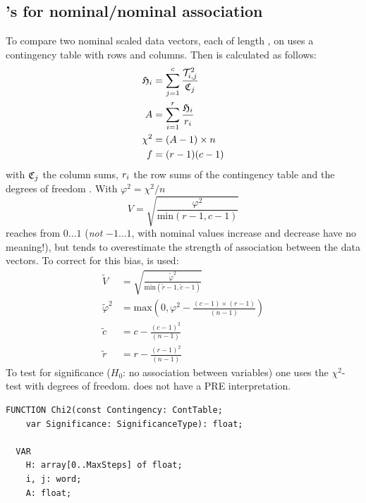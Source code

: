 \begin{refsection}
\subsection{'s  for nominal/nominal association}

To compare two nominal scaled data vectors, each of length , on uses a contingency table  with  rows and  columns. Then  is calculated as follows:
\begin{align}
  \mathfrak{H}_i &= \sum_{j=1}^c{\frac{\mathcal{T}_{i,j}^2}{\mathfrak{C}_j}} \\
  A      &= \sum_{i=1}^r{\frac{\mathfrak{H}_i}{r_i}} \\
  \chi^2 &= (A-1) \times n \\
  f      &= (r-1) (c-1) \\
\end{align}
with \(\mathfrak{C}_j \) the column sums, \(r_i \) the row sums of the contingency table and  the degrees of freedom \parencite{Pea-00}. With \(\varphi^2 = \chi^2 / n \)
\begin{equation}
  V = \sqrt{\frac{\varphi^2}{\mathrm{min}(r-1, c-1)}}
\end{equation}
 reaches from \(0\ldots 1 \) (\emph{not} \(-1\ldots 1 \), with nominal values increase and decrease have no meaning!),  but tends to overestimate the strength of association between the data vectors. To correct for this bias,  is used:
\begin{align}
  \tilde{V} &= \sqrt{\frac{\tilde{\varphi}^2}{\mathrm{min}(\tilde{r}-1, \tilde{c}-1)}} \\
  \tilde{\varphi}^2 &= \mathrm{max}(0, \varphi^2 - \frac{(c-1)\times (r-1)}{(n-1)}) \\
  \tilde{c} &= c - \frac{(c-1)^2}{(n-1)} \\
  \tilde{r} &= r - \frac{(r-1)^2}{(n-1)}
\end{align}
To test for significance (\( H_0 \): no association between variables) one uses the \( \chi^2 \)-test with  degrees of freedom.  does not have a PRE interpretation.

\begin{lstlisting}[caption=Common correlation measures without PRE-interpretation for enumeration types]
  FUNCTION Chi2(const Contingency: ContTable;
    var Significance: SignificanceType): float;

  VAR
    H: array[0..MaxSteps] of float;
    i, j: word;
    A: float;


\end{lstlisting}
\end{refsection}
